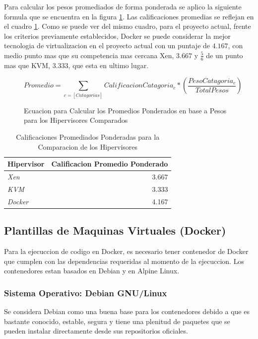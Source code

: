 Para calcular los pesos promediados de forma ponderada se aplico la siguiente formula que se encuentra en la figura \ref{fig:hipervisor-calif-equ}. Las calificaciones promedias se reflejan en el cuadro \ref{tab:hipervisor-compar-promed}. Como se puede ver del mismo cuadro, para el proyecto actual, frente los criterios previamente establecidos, Docker se puede considerar la mejor tecnologia de virtualizacion en el proyecto actual con un puntaje de $4.167$, con medio punto mas que su competencia mas cercana Xen, $3.667$ y $\frac{5}{6}$ de un punto mas que KVM, $3.333$, que esta en ultimo lugar.

\begin{figure}
	\[
		Promedio = \sum_{c = [Catagorias]} CalificacionCatagoria_c * \left ( \frac{PesoCatagoria_c}{TotalPesos} \right )
	\]
	\caption{Ecuacion para Calcular los Promedios Ponderados en base a Pesos para los Hipervisores Comparados}
    \label{fig:hipervisor-calif-equ}
\end{figure}

\begin{table}
	\centering
	\begin{tabular}{|l|r|}
    	\hline
		\textbf{Hipervisor} & \textbf{Calificacion Promedio Ponderado} \\
        \hline
        \textit{Xen} & 3.667 \\
        \hline
        \textit{KVM} & 3.333 \\
        \hline
        \textit{Docker} & 4.167 \\
        \hline
	\end{tabular}
    \caption{Calificaciones Promediados Ponderadas para la Comparacion de los Hipervisores}
    \label{tab:hipervisor-compar-promed}
\end{table}

\subsection{Plantillas de Maquinas Virtuales (Docker)}
Para la ejecuccion de codigo en Docker, es necesario tener contenedor de Docker que cumplen con las dependencias requeridas al momento de la ejecuccion. Los contenedores estan basados en Debian y en Alpine Linux.

\subsubsection{Sistema Operativo: Debian GNU/Linux}
Se considera Debian como una buena base para los contenedores debido a que es bastante conocido, estable, segura y tiene una plenitud de paquetes que se pueden instalar directamente desde sus repositorios oficiales.

